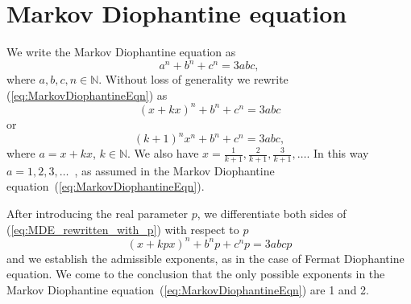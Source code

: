 \documentclass[11pt]{article}
\begin{document}

\section{Markov Diophantine equation}\label{MarkovEquation}


We write the Markov Diophantine equation %
as
\begin{equation}
\label{eq:MarkovDiophantineEqn}
a^{n} + b^{n} + c^{n} = 3\mathit{abc},
\end{equation}
where $a, b, c, n \in \mathbb{N}$.
Without loss of generality we rewrite (\ref{eq:MarkovDiophantineEqn}) as
\begin{equation}
(x + kx)^{n} + b^{n} + c^{n} = 3\mathit{abc}
\end{equation}
or
\begin{equation}
\label{eq:MDE_rewritten_x}
(k + 1)^{n} x^{n} + b^{n} + c^{n} = 3\mathit{abc},
\end{equation}
where $a = x + kx$, $k \in \mathbb{N}$.
We also have $x = \frac{1}{k+1}, \frac{2}{k+1}, \frac{3}{k+1}, \ldots$\@.
In this way $a = 1, 2, 3, \ldots$~, as assumed in the Markov Diophantine
equation~(\ref{eq:MarkovDiophantineEqn})\@.

After introducing the real parameter $p$,
we differentiate both sides of (\ref{eq:MDE_rewritten_with_p}) with respect to $p$
\begin{equation}
\label{eq:MDE_rewritten_with_p}
(x + kpx)^{n} + b^{n}p + c^{n}p = 3\mathit{abc}p
\end{equation}
and we establish the admissible exponents, as in the case of Fermat Diophantine equation.
We come to the
conclusion that the only possible exponents in the Markov Diophantine equation~(\ref{eq:MarkovDiophantineEqn})
are 1 and 2.

\end{document}

